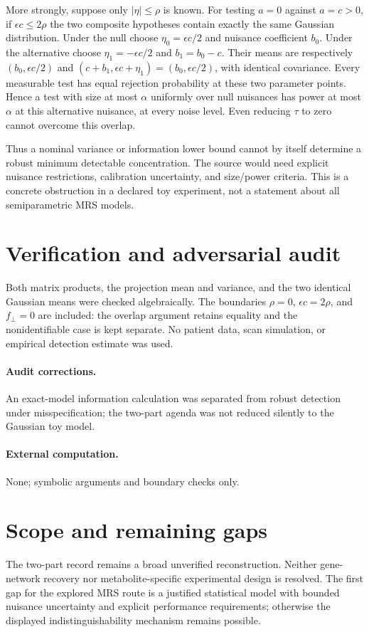 \documentclass[11pt]{article}
\begin{document}
More strongly, suppose only $|\eta|\le\rho$ is known. For testing $a=0$
against $a=c>0$, if $\epsilon c\le2\rho$ the two composite hypotheses
contain exactly the same Gaussian distribution. Under the null choose
$\eta_0=\epsilon c/2$ and nuisance coefficient $b_0$. Under the alternative
choose $\eta_1=-\epsilon c/2$ and $b_1=b_0-c$. Their means are respectively
$(b_0,\epsilon c/2)$ and
$(c+b_1,\epsilon c+\eta_1)=(b_0,\epsilon c/2)$, with identical covariance.
Every measurable test has equal rejection probability at these two parameter
points. Hence a test with size at most $\alpha$ uniformly over null nuisances
has power at most $\alpha$ at this alternative nuisance, at every noise level.
Even reducing $\tau$ to zero cannot overcome this overlap.

Thus a nominal variance or information lower bound cannot by itself determine
a robust minimum detectable concentration. The source would need explicit
nuisance restrictions, calibration uncertainty, and size/power criteria. This
is a concrete obstruction in a declared toy experiment, not a statement about
all semiparametric MRS models.
\section{Verification and adversarial audit}
Both matrix products, the projection mean and variance, and the two
identical Gaussian means were checked algebraically. The boundaries
$\rho=0$, $\epsilon c=2\rho$, and $f_\perp=0$ are included: the overlap
argument retains equality and the nonidentifiable case is kept separate.
No patient data, scan simulation, or empirical detection estimate was used.
\paragraph{Audit corrections.} An exact-model information calculation was separated from robust detection under misspecification; the two-part agenda was not reduced silently to the Gaussian toy model.
\paragraph{External computation.} None; symbolic arguments and boundary checks only.
\section{Scope and remaining gaps}
The two-part record remains a broad unverified reconstruction. Neither
gene-network recovery nor metabolite-specific experimental design is resolved.
The first gap for the explored MRS route is a justified statistical model with
bounded nuisance uncertainty and explicit performance requirements; otherwise
the displayed indistinguishability mechanism remains possible.
\end{document}
